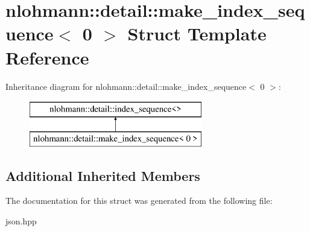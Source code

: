 \hypertarget{structnlohmann_1_1detail_1_1make__index__sequence_3_010_01_4}{}\section{nlohmann\+:\+:detail\+:\+:make\+\_\+index\+\_\+sequence$<$ 0 $>$ Struct Template Reference}
\label{structnlohmann_1_1detail_1_1make__index__sequence_3_010_01_4}
Inheritance diagram for nlohmann\+:\+:detail\+:\+:make\+\_\+index\+\_\+sequence$<$ 0 $>$\+:\begin{figure}[H]
\begin{center}
\leavevmode
\includegraphics[height=2.000000cm]{structnlohmann_1_1detail_1_1make__index__sequence_3_010_01_4}
\end{center}
\end{figure}
\subsection*{Additional Inherited Members}


The documentation for this struct was generated from the following file\+:\begin{DoxyCompactItemize}
\item 
json.\+hpp\end{DoxyCompactItemize}
